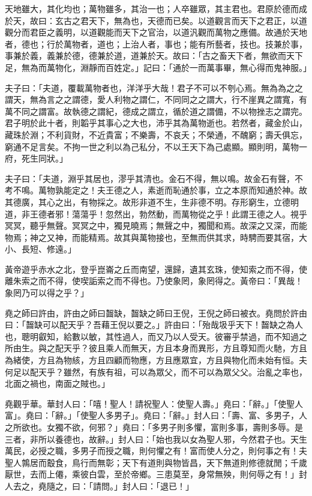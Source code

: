 
\begin{pinyinscope}
天地雖大，其化均也；萬物雖多，其治一也；人卒雖眾，其主君也。君原於德而成於天，故曰：玄古之君天下，無為也，天德而已矣。以道觀言而天下之君正，以道觀分而君臣之義明，以道觀能而天下之官治，以道汎觀而萬物之應備。故通於天地者，德也；行於萬物者，道也；上治人者，事也；能有所藝者，技也。技兼於事，事兼於義，義兼於德，德兼於道，道兼於天。故曰：「古之畜天下者，無欲而天下足，無為而萬物化，淵靜而百姓定。」記曰：「通於一而萬事畢，無心得而鬼神服。」

夫子曰：「夫道，覆載萬物者也，洋洋乎大哉！君子不可以不刳心焉。無為為之之謂天，無為言之之謂德，愛人利物之謂仁，不同同之之謂大，行不崖異之謂寬，有萬不同之謂富。故執德之謂紀，德成之謂立，循於道之謂備，不以物挫志之謂完。君子明於此十者，則韜乎其事心之大也，沛乎其為萬物逝也。若然者，藏金於山，藏珠於淵；不利貨財，不近貴富；不樂壽，不哀夭；不榮通，不醜窮；壽夭俱忘，窮通不足言矣。不拘一世之利以為己私分，不以王天下為己處顯。顯則明，萬物一府，死生同狀。」

夫子曰：「夫道，淵乎其居也，漻乎其清也。金石不得，無以鳴。故金石有聲，不考不鳴。萬物孰能定之！夫王德之人，素逝而恥通於事，立之本原而知通於神。故其德廣，其心之出，有物採之。故形非道不生，生非德不明。存形窮生，立德明道，非王德者邪！蕩蕩乎！忽然出，勃然動，而萬物從之乎！此謂王德之人。視乎冥冥，聽乎無聲。冥冥之中，獨見曉焉；無聲之中，獨聞和焉。故深之又深，而能物焉；神之又神，而能精焉。故其與萬物接也，至無而供其求，時騁而要其宿，大小、長短、修遠。」

黃帝遊乎赤水之北，登乎崑崙之丘而南望，還歸，遺其玄珠，使知索之而不得，使離朱索之而不得，使喫詬索之而不得也。乃使象罔，象罔得之。黃帝曰：「異哉！象罔乃可以得之乎？」

堯之師曰許由，許由之師曰齧缺，齧缺之師曰王倪，王倪之師曰被衣。堯問於許由曰：「齧缺可以配天乎？吾藉王倪以要之。」許由曰：「殆哉圾乎天下！齧缺之為人也，聰明叡知，給數以敏，其性過人，而又乃以人受天。彼審乎禁過，而不知過之所由生。與之配天乎？彼且乘人而無天，方且本身而異形，方且尊知而火馳，方且為緒使，方且為物絯，方且四顧而物應，方且應眾宜，方且與物化而未始有恒。夫何足以配天乎？雖然，有族有祖，可以為眾父，而不可以為眾父父。治亂之率也，北面之禍也，南面之賊也。」

堯觀乎華。華封人曰：「嘻！聖人！請祝聖人：使聖人壽。」堯曰：「辭。」「使聖人富」。堯曰：「辭。」「使聖人多男子」。堯曰：「辭。」封人曰：「壽、富、多男子，人之所欲也。女獨不欲，何邪？」堯曰：「多男子則多懼，富則多事，壽則多辱。是三者，非所以養德也，故辭。」封人曰：「始也我以女為聖人邪，今然君子也。天生萬民，必授之職，多男子而授之職，則何懼之有！富而使人分之，則何事之有！夫聖人鶉居而鷇食，鳥行而無彰；天下有道則與物皆昌，天下無道則修德就閒；千歲厭世，去而上僊，乘彼白雲，至於帝鄉。三患莫至，身常無殃，則何辱之有！」封人去之，堯隨之，曰：「請問。」封人曰：「退已！」


\end{pinyinscope}
